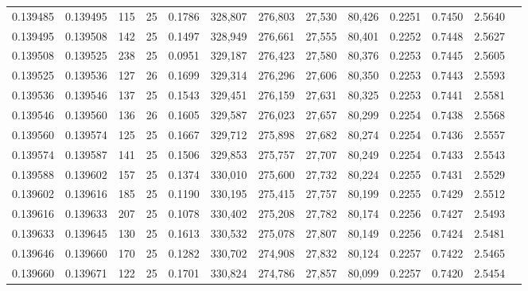 \begin{tabular}{rrrrrrrrrrrrr}
0.139485 & 0.139495 &   115 &  25 &                                     0.1786 & 328,807 & 276,803 &  27,530 &  80,426 & 0.2251 & 0.7450 & 2.5640 \\
0.139495 & 0.139508 &   142 &  25 &                                     0.1497 & 328,949 & 276,661 &  27,555 &  80,401 & 0.2252 & 0.7448 & 2.5627 \\
0.139508 & 0.139525 &   238 &  25 &                                     0.0951 & 329,187 & 276,423 &  27,580 &  80,376 & 0.2253 & 0.7445 & 2.5605 \\
0.139525 & 0.139536 &   127 &  26 &                                     0.1699 & 329,314 & 276,296 &  27,606 &  80,350 & 0.2253 & 0.7443 & 2.5593 \\
0.139536 & 0.139546 &   137 &  25 &                                     0.1543 & 329,451 & 276,159 &  27,631 &  80,325 & 0.2253 & 0.7441 & 2.5581 \\
0.139546 & 0.139560 &   136 &  26 &                                     0.1605 & 329,587 & 276,023 &  27,657 &  80,299 & 0.2254 & 0.7438 & 2.5568 \\
0.139560 & 0.139574 &   125 &  25 &                                     0.1667 & 329,712 & 275,898 &  27,682 &  80,274 & 0.2254 & 0.7436 & 2.5557 \\
0.139574 & 0.139587 &   141 &  25 &                                     0.1506 & 329,853 & 275,757 &  27,707 &  80,249 & 0.2254 & 0.7433 & 2.5543 \\
0.139588 & 0.139602 &   157 &  25 &                                     0.1374 & 330,010 & 275,600 &  27,732 &  80,224 & 0.2255 & 0.7431 & 2.5529 \\
0.139602 & 0.139616 &   185 &  25 &                                     0.1190 & 330,195 & 275,415 &  27,757 &  80,199 & 0.2255 & 0.7429 & 2.5512 \\
0.139616 & 0.139633 &   207 &  25 &                                     0.1078 & 330,402 & 275,208 &  27,782 &  80,174 & 0.2256 & 0.7427 & 2.5493 \\
0.139633 & 0.139645 &   130 &  25 &                                     0.1613 & 330,532 & 275,078 &  27,807 &  80,149 & 0.2256 & 0.7424 & 2.5481 \\
0.139646 & 0.139660 &   170 &  25 &                                     0.1282 & 330,702 & 274,908 &  27,832 &  80,124 & 0.2257 & 0.7422 & 2.5465 \\
0.139660 & 0.139671 &   122 &  25 &                                     0.1701 & 330,824 & 274,786 &  27,857 &  80,099 & 0.2257 & 0.7420 & 2.5454 \\

\end{tabular}
